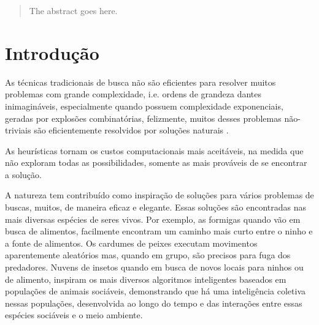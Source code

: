 \documentclass[conference,compsoc]{IEEEtran}
\begin{document}




\maketitle

\begin{abstract}
The abstract goes here.
\end{abstract}





%
\IEEEpeerreviewmaketitle



\section{Introdução}\label{arte:intro}
As técnicas tradicionais de busca não são eficientes para resolver muitos problemas com grande complexidade, i.e. ordens de grandeza dantes inimagináveis, 
especialmente quando possuem complexidade exponenciais, geradas por explosões combinatórias, felizmente, muitos desses problemas não-triviais 
são eficientemente resolvidos por soluções naturais \cite{Swarm_Medeiros}.

As heurísticas tornam os custos computacionais mais aceitáveis, na medida que não exploram todas as possibilidades,
somente as mais prováveis de se encontrar a solução.

A natureza tem contribuído como inspiração de soluções para vários problemas de buscas, muitos, de maneira eficaz e elegante. 
Essas soluções são encontradas nas mais diversas espécies de seres vivos. Por exemplo, as formigas quando vão em busca de alimentos, facilmente encontram um caminho 
mais curto entre o ninho e a fonte de alimentos. Os cardumes de peixes executam movimentos aparentemente aleatórios mas, quando em grupo, são precisos para fuga dos predadores. 
Nuvens de insetos quando em busca de novos locais para ninhos ou de alimento, inspiram os mais diversos algoritmos inteligentes baseados em populações de animais sociáveis, demonstrando 
que há uma inteligência coletiva nessas populações, desenvolvida ao longo do tempo e das interações entre essas espécies sociáveis e o meio ambiente.
\end{document}
